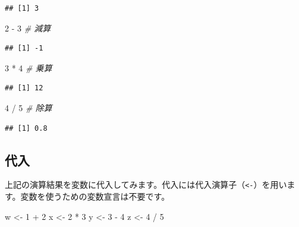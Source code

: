 \documentclass[
  12pt,
]{book}
\newenvironment{Shaded}{\begin{snugshade}}{\end{snugshade}}
\newcommand{\CommentTok}[1]{\textcolor[rgb]{0.56,0.35,0.01}{\textit{#1}}}
\newcommand{\DecValTok}[1]{\textcolor[rgb]{0.00,0.00,0.81}{#1}}
\newcommand{\NormalTok}[1]{#1}
\newcommand{\OtherTok}[1]{\textcolor[rgb]{0.56,0.35,0.01}{#1}}
\newcommand{\SpecialCharTok}[1]{\textcolor[rgb]{0.00,0.00,0.00}{#1}}
\begin{document}
\begin{verbatim}
## [1] 3
\end{verbatim}

\begin{Shaded}
\begin{Highlighting}[numbers=left,,]
\DecValTok{2} \SpecialCharTok{{-}} \DecValTok{3}     \CommentTok{\# 減算}
\end{Highlighting}
\end{Shaded}

\begin{verbatim}
## [1] -1
\end{verbatim}

\begin{Shaded}
\begin{Highlighting}[numbers=left,,]
\DecValTok{3} \SpecialCharTok{*} \DecValTok{4}     \CommentTok{\# 乗算}
\end{Highlighting}
\end{Shaded}

\begin{verbatim}
## [1] 12
\end{verbatim}

\begin{Shaded}
\begin{Highlighting}[numbers=left,,]
\DecValTok{4} \SpecialCharTok{/} \DecValTok{5}     \CommentTok{\# 除算}
\end{Highlighting}
\end{Shaded}

\begin{verbatim}
## [1] 0.8
\end{verbatim}

\hypertarget{ux4ee3ux5165}{%
\subsection{代入}\label{ux4ee3ux5165}}

上記の演算結果を変数に代入してみます。代入には代入演算子（\texttt{\textless{}-}）を用います。変数を使うための変数宣言は不要です。

\begin{Shaded}
\begin{Highlighting}[numbers=left,,]
\NormalTok{w }\OtherTok{\textless{}{-}} \DecValTok{1} \SpecialCharTok{+} \DecValTok{2}
\NormalTok{x }\OtherTok{\textless{}{-}} \DecValTok{2} \SpecialCharTok{*} \DecValTok{3}
\NormalTok{y }\OtherTok{\textless{}{-}} \DecValTok{3} \SpecialCharTok{{-}} \DecValTok{4}
\NormalTok{z }\OtherTok{\textless{}{-}} \DecValTok{4} \SpecialCharTok{/} \DecValTok{5}
\end{Highlighting}
\end{Shaded}
\end{document}
